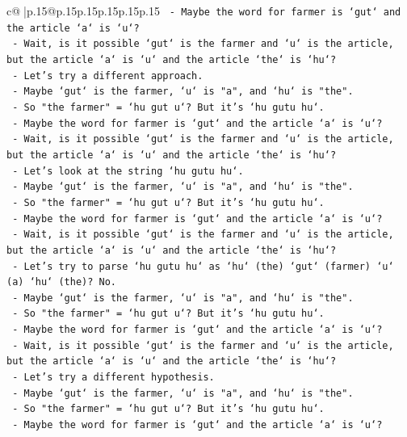 \documentclass{article}
\begin{document}
{\begin{supertabular}{c@{$\;$}|p{.15\linewidth}@{}p{.15\linewidth}p{.15\linewidth}p{.15\linewidth}p{.15\linewidth}p{.15\linewidth}}
{{{\texttt{   {-} Maybe the word for farmer is `gut` and the article `a` is `u`?} \\
\texttt{   {-} Wait, is it possible `gut` is the farmer and `u` is the article, but the article `a` is `u` and the article `the` is `hu`?} \\
\texttt{   {-} Let's try a different approach.} \\
\texttt{   {-} Maybe `gut` is the farmer, `u` is "a", and `hu` is "the".} \\
\texttt{   {-} So "the farmer" = `hu gut u`? But it's `hu gutu hu`.} \\
\texttt{   {-} Maybe the word for farmer is `gut` and the article `a` is `u`?} \\
\texttt{   {-} Wait, is it possible `gut` is the farmer and `u` is the article, but the article `a` is `u` and the article `the` is `hu`?} \\
\texttt{   {-} Let's look at the string `hu gutu hu`.} \\
\texttt{   {-} Maybe `gut` is the farmer, `u` is "a", and `hu` is "the".} \\
\texttt{   {-} So "the farmer" = `hu gut u`? But it's `hu gutu hu`.} \\
\texttt{   {-} Maybe the word for farmer is `gut` and the article `a` is `u`?} \\
\texttt{   {-} Wait, is it possible `gut` is the farmer and `u` is the article, but the article `a` is `u` and the article `the` is `hu`?} \\
\texttt{   {-} Let's try to parse `hu gutu hu` as `hu` (the) `gut` (farmer) `u` (a) `hu` (the)? No.} \\
\texttt{   {-} Maybe `gut` is the farmer, `u` is "a", and `hu` is "the".} \\
\texttt{   {-} So "the farmer" = `hu gut u`? But it's `hu gutu hu`.} \\
\texttt{   {-} Maybe the word for farmer is `gut` and the article `a` is `u`?} \\
\texttt{   {-} Wait, is it possible `gut` is the farmer and `u` is the article, but the article `a` is `u` and the article `the` is `hu`?} \\
\texttt{   {-} Let's try a different hypothesis.} \\
\texttt{   {-} Maybe `gut` is the farmer, `u` is "a", and `hu` is "the".} \\
\texttt{   {-} So "the farmer" = `hu gut u`? But it's `hu gutu hu`.} \\
\texttt{   {-} Maybe the word for farmer is `gut` and the article `a` is `u`?} \\
}}}
\end{supertabular}}
\end{document}
